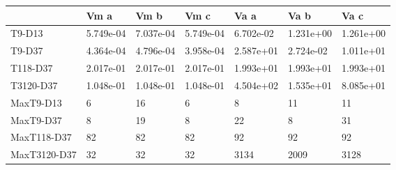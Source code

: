 \begin{tabular}{lllllll}
\toprule
{} &       Vm a &       Vm b &       Vm c &       Va a &       Va b &       Va c \\
\midrule
T9-D13       &  5.749e-04 &  7.037e-04 &  5.749e-04 &  6.702e-02 &  1.231e+00 &  1.261e+00 \\
T9-D37       &  4.364e-04 &  4.796e-04 &  3.958e-04 &  2.587e+01 &  2.724e-02 &  1.011e+01 \\
T118-D37     &  2.017e-01 &  2.017e-01 &  2.017e-01 &  1.993e+01 &  1.993e+01 &  1.993e+01 \\
T3120-D37    &  1.048e-01 &  1.048e-01 &  1.048e-01 &  4.504e+02 &  1.535e+01 &  8.085e+01 \\
MaxT9-D13    &          6 &         16 &          6 &          8 &         11 &         11 \\
MaxT9-D37    &          8 &         19 &          8 &         22 &          8 &         31 \\
MaxT118-D37  &         82 &         82 &         82 &         92 &         92 &         92 \\
MaxT3120-D37 &         32 &         32 &         32 &       3134 &       2009 &       3128 \\
\bottomrule
\end{tabular}
